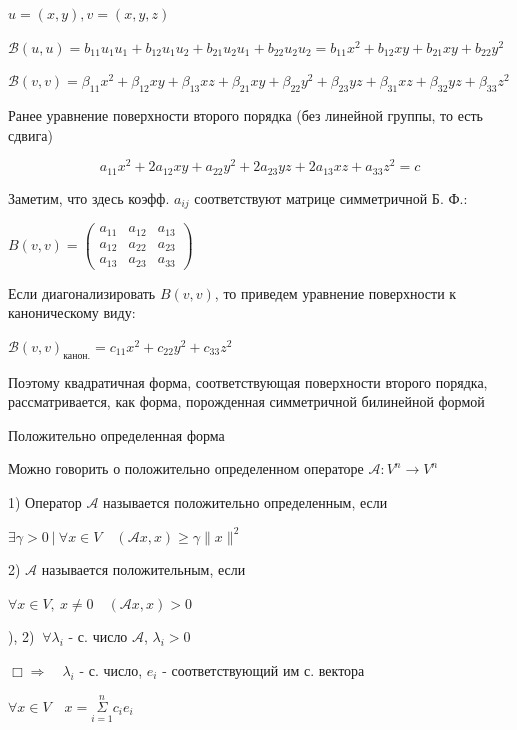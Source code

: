 \documentclass[12pt]{article}
\begin{document}
    $u = (x, y), v = (x, y, z)$

    $\mathcal{B}(u, u) = b_{11}u_1 u_1 + b_{12} u_1 u_2 + b_{21} u_2 u_1 + b_{22} u_2 u_2 = b_{11} x^2 + b_{12}xy + b_{21}xy + b_{22}y^2$

    $\mathcal{B}(v, v) = \beta_{11} x^2 + \beta_{12}xy + \beta_{13}xz + \beta_{21} xy + \beta_{22}y^2 + \beta_{23}yz + \beta_{31} xz + \beta_{32}yz + \beta_{33}z^2$

    \Mem Ранее уравнение поверхности второго порядка (без линейной группы, то есть сдвига)

    \[a_{11}x^2 + 2a_{12}xy + a_{22}y^2 + 2a_{23}yz + 2a_{13}xz + a_{33}z^2 = c\]

    \Nota Заметим, что здесь коэфф. $a_{ij}$ соответствуют матрице симметричной Б. Ф.:

    $B(v, v) = \begin{pmatrix}a_{11} & a_{12} & a_{13} \\ a_{12} & a_{22} & a_{23} \\ a_{13} & a_{23} & a_{33}\end{pmatrix}$

    Если диагонализировать $B(v, v)$, то приведем уравнение поверхности к каноническому виду:

    $\mathcal{B}(v, v)_{\text{канон.}} = c_{11}x^2 + c_{22}y^2 + c_{33}z^2$

    Поэтому квадратичная форма, соответствующая поверхности второго порядка, рассматривается, как форма, порожденная симметричной билинейной формой

    \Def Положительно определенная форма

    \Nota Можно говорить о положительно определенном операторе $\mathcal{A}: V^n \rightarrow V^n$

    1) Оператор $\mathcal{A}$ называется положительно определенным, если

    $\exists \gamma > 0 \ | \ \forall x \in V \quad (\mathcal{A}x, x) \geq \gamma \|x\|^2$

    2) $\mathcal{A}$ называется положительным, если

    $\forall x \in V, \ x \neq 0 \quad (\mathcal{A}x, x) > 0$

    ), 2) \Longleftrightarrow $\ \forall \lambda_i$ - с. число $\mathcal{A}$, $\lambda_i > 0$

    $\Box \Longrightarrow \quad \lambda_i$ - с. число, $e_i$ - соответствующий им с. вектора

    $\forall x \in V \quad x = \overset{n}{\underset{i = 1}{\Sigma}} c_i e_i$
\end{document}
